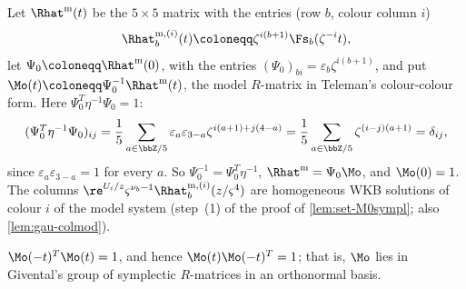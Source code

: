 
\begin{defn}
\label{def:set-M0}
Let $\Rhat^{\mathrm m}(t)$ be the $5\times5$ matrix with the entries (row $b$, colour column $i$)
\[
\Rhat^{\mathrm m,(i)}_b(t)\coloneqq\zeta^{i(b+1)}\Fs_b(\zeta^{-i}t),
\]
let $\Psi_0\coloneqq\Rhat^{\mathrm m}(0)$, with the entries $(\Psi_0)_{bi}=\varepsilon_b\zeta^{i(b+1)}$, and put $\Mo(t)\coloneqq\Psi_0^{-1}\Rhat^{\mathrm m}(t)$, the model $R$-matrix in Teleman's colour-colour form. Here $\Psi_0^T\eta^{-1}\Psi_0=1$:
\[
(\Psi_0^T\eta^{-1}\Psi_0)_{ij}=\frac15\sum_{a\in\bbZ/5}\varepsilon_a\varepsilon_{3-a}\zeta^{i(a+1)+j(4-a)}=\frac15\sum_{a\in\bbZ/5}\zeta^{(i-j)(a+1)}=\delta_{ij},
\]
since $\varepsilon_a\varepsilon_{3-a}=1$ for every $a$. So $\Psi_0^{-1}=\Psi_0^T\eta^{-1}$, $\Rhat^{\mathrm m}=\Psi_0\Mo$, and $\Mo(0)=1$. The columns $\re^{U_i/z}\varsigma^{\nu_b-1}\Rhat^{\mathrm m,(i)}_b(z/\varsigma^4)$ are homogeneous WKB solutions of colour $i$ of the model system (step~(1) of the proof of \cref{lem:set-M0sympl}; also \cref{lem:gau-colmod}).
\end{defn}

\begin{lem}[Symplecticity of $\Mo$]
\label{lem:set-M0sympl}
$\Mo(-t)^T\Mo(t)=1$, and hence $\Mo(t)\Mo(-t)^T=1$; that is, $\Mo$ lies in Givental's group of symplectic $R$-matrices in an orthonormal basis.
\end{lem}

